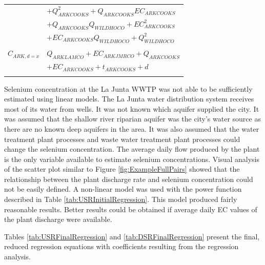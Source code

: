 \begin{table}[htbp]
\begin{tabular}{c l}
					& $+ Q_{ARKCOOKS}^2+ Q_{ARKCOOKS} EC_{ARKCOOKS} $\\
					& $+ Q_{ARKCOOKS} Q_{WILDHOCO}+ EC_{ARKCOOKS}^2 $\\
					& $+ EC_{ARKCOOKS} Q_{WILDHOCO}+ Q_{WILDHOCO}^2$\\
	\\
	$ C_{ARK,d=x} $	& $Q_{ARKLAMCO} + EC_{ARKJMRCO} + Q_{ARKCOOKS}$ \\
					& $+ EC_{ARKCOOKS} + t_{ARKCOOKS} + d$\\
	\bottomrule \\
\end{tabular}
\end{table}

Selenium concentration at the La Junta WWTP was not able to be sufficiently estimated using linear models.  The La Junta water distribution system receives most of its water from wells.  It was not known which aquifer supplied the city.  It was assumed that the shallow river riparian aquifer was the city's water source as there are no known deep aquifers in the area.  It was also assumed that the water treatment plant processes and waste water treatment plant processes could change the selenium concentration.  The average daily flow produced by the plant is the only variable available to estimate selenium concentrations.  Visual analysis of the scatter plot similar to Figure \ref{fig:ExampleFullPairs} showed that the relationship between the plant discharge rate and selenium concentration could not be easily defined.  A non-linear model was used with the power function described in Table \ref{tab:USRInitialRegression}.  This model produced fairly reasonable results.  Better results could be obtained if average daily EC values of the plant discharge were available.

Tables \ref{tab:USRFinalRegression} and \ref{tab:DSRFinalRegression} present the final, reduced regression equations with coefficients resulting from the regression analysis.

